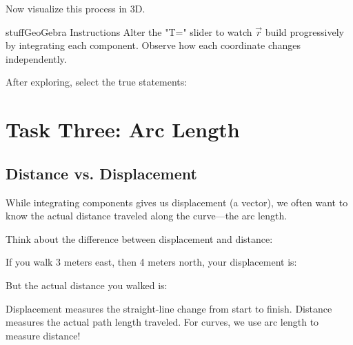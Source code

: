 \documentclass{ximera}
\begin{document}
\begin{problem}
Now visualize this process in 3D.

\begin{expandable}{stuff}{GeoGebra Instructions}
    Alter the "T=" slider to watch $\vec{r}$ build progressively by integrating each component. Observe how each coordinate changes independently.
\end{expandable}

\begin{center}
\end{center}

After exploring, select the true statements:
\begin{selectAll}
\end{selectAll}
\end{problem}

\section*{Task Three: Arc Length}

\subsection*{Distance vs. Displacement}

While integrating components gives us displacement (a vector), we often want to know the actual distance traveled along the curve—the arc length.

\begin{problem}
Think about the difference between displacement and distance:

If you walk 3 meters east, then 4 meters north, your displacement is:
\begin{multipleChoice}
\end{multipleChoice}

But the actual distance you walked is:
\begin{multipleChoice}
\end{multipleChoice}

\begin{feedback}
Displacement measures the straight-line change from start to finish. Distance measures the actual path length traveled. For curves, we use arc length to measure distance!
\end{feedback}
\end{problem}
\end{document}
